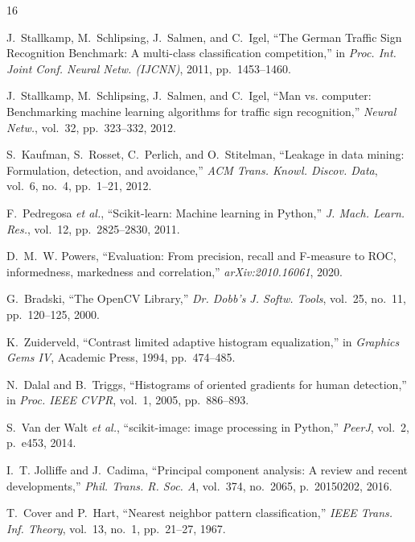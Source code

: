 \documentclass[conference]{IEEEtran}
\begin{document}
\begin{thebibliography}{16}

J.~Stallkamp, M.~Schlipsing, J.~Salmen, and C.~Igel, ``The German Traffic Sign Recognition Benchmark: A multi-class classification competition,'' in \textit{Proc. Int. Joint Conf. Neural Netw. (IJCNN)}, 2011, pp.~1453--1460.

J.~Stallkamp, M.~Schlipsing, J.~Salmen, and C.~Igel, ``Man vs. computer: Benchmarking machine learning algorithms for traffic sign recognition,'' \textit{Neural Netw.}, vol.~32, pp.~323--332, 2012.

S.~Kaufman, S.~Rosset, C.~Perlich, and O.~Stitelman, ``Leakage in data mining: Formulation, detection, and avoidance,'' \textit{ACM Trans. Knowl. Discov. Data}, vol.~6, no.~4, pp.~1--21, 2012.

F.~Pedregosa \textit{et al.}, ``Scikit-learn: Machine learning in Python,'' \textit{J. Mach. Learn. Res.}, vol.~12, pp.~2825--2830, 2011.

D.~M.~W. Powers, ``Evaluation: From precision, recall and F-measure to ROC, informedness, markedness and correlation,'' \textit{arXiv:2010.16061}, 2020.

G.~Bradski, ``The OpenCV Library,'' \textit{Dr. Dobb's J. Softw. Tools}, vol.~25, no.~11, pp.~120--125, 2000.

K.~Zuiderveld, ``Contrast limited adaptive histogram equalization,'' in \textit{Graphics Gems IV}, Academic Press, 1994, pp.~474--485.

N.~Dalal and B.~Triggs, ``Histograms of oriented gradients for human detection,'' in \textit{Proc. IEEE CVPR}, vol.~1, 2005, pp.~886--893.

S.~Van der Walt \textit{et al.}, ``scikit-image: image processing in Python,'' \textit{PeerJ}, vol.~2, p.~e453, 2014.

I.~T. Jolliffe and J.~Cadima, ``Principal component analysis: A review and recent developments,'' \textit{Phil. Trans. R. Soc. A}, vol.~374, no.~2065, p.~20150202, 2016.

T.~Cover and P.~Hart, ``Nearest neighbor pattern classification,'' \textit{IEEE Trans. Inf. Theory}, vol.~13, no.~1, pp.~21--27, 1967.


\end{thebibliography}
\end{document}
